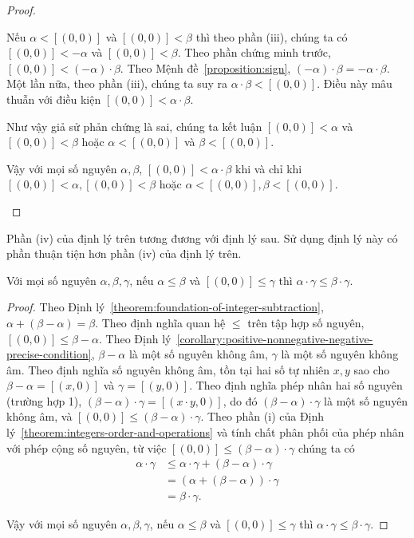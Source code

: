 \begin{proof}
\begin{enumerate}[label={(\roman*)}]
		      Nếu $\alpha < [(0,0)]$ và $[(0,0)] < \beta$ thì theo phần (iii), chúng ta có $[(0,0)] < -\alpha$ và $[(0,0)] < \beta$. Theo phần chứng minh trước, $[(0,0)] < (-\alpha)\cdot\beta$. Theo Mệnh đề~\ref{proposition:sign}, $(-\alpha)\cdot\beta = -\alpha\cdot\beta$. Một lần nữa, theo phần (iii), chúng ta suy ra $\alpha\cdot\beta < [(0,0)]$. Điều này mâu thuẫn với điều kiện $[(0,0)] < \alpha\cdot\beta$.

		      Như vậy giả sử phản chứng là sai, chúng ta kết luận $[(0,0)] < \alpha$ và $[(0,0)] < \beta$ hoặc $\alpha < [(0,0)]$ và $\beta < [(0,0)]$.

		      Vậy với mọi số nguyên $\alpha, \beta$, $[(0,0)] < \alpha\cdot \beta$ khi và chỉ khi $[(0,0)] < \alpha, [(0,0)] < \beta$ hoặc $\alpha < [(0,0)], \beta < [(0,0)]$.
	\end{enumerate}
\end{proof}

Phần (iv) của định lý trên tương đương với định lý sau. Sử dụng định lý này có phần thuận tiện hơn phần (iv) của định lý trên.

\begin{theorem}
	Với mọi số nguyên $\alpha, \beta, \gamma$, nếu $\alpha\leq\beta$ và $[(0,0)]\leq\gamma$ thì $\alpha\cdot\gamma \leq \beta\cdot\gamma$.
\end{theorem}

\begin{proof}
	Theo Định lý~\ref{theorem:foundation-of-integer-subtraction}, $\alpha + (\beta - \alpha) = \beta$. Theo định nghĩa quan hệ $\leq$ trên tập hợp số nguyên, $[(0,0)] \leq \beta - \alpha$. Theo Định lý~\ref{corollary:positive-nonnegative-negative-precise-condition}, $\beta - \alpha$ là một số nguyên không âm, $\gamma$ là một số nguyên không âm. Theo định nghĩa số nguyên không âm, tồn tại hai số tự nhiên $x, y$ sao cho $\beta - \alpha = [(x, 0)]$ và $\gamma = [(y, 0)]$. Theo định nghĩa phép nhân hai số nguyên (trường hợp 1), $(\beta - \alpha)\cdot\gamma = [(x\cdot y, 0)]$, do đó $(\beta - \alpha)\cdot\gamma$ là một số nguyên không âm, và $[(0,0)]\leq (\beta - \alpha)\cdot\gamma$. Theo phần (i) của Định lý~\ref{theorem:integers-order-and-operations} và tính chất phân phối của phép nhân với phép cộng số nguyên, từ việc $[(0,0)]\leq (\beta - \alpha)\cdot\gamma$ chúng ta có
	\begin{align*}
		\alpha\cdot\gamma & \leq \alpha\cdot\gamma + (\beta - \alpha)\cdot\gamma \\
		                  & = (\alpha + (\beta - \alpha))\cdot\gamma             \\
		                  & = \beta\cdot\gamma.
	\end{align*}

	Vậy với mọi số nguyên $\alpha, \beta, \gamma$, nếu $\alpha\leq\beta$ và $[(0,0)]\leq\gamma$ thì $\alpha\cdot\gamma \leq \beta\cdot\gamma$.
\end{proof}

